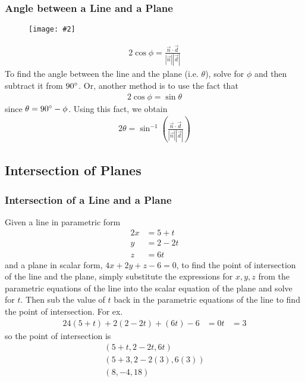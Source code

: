 \documentclass[letterpaper, 12pt]{report}
\newcommand{\diagram}[2][0.5]{
	\begin{figure}[H]
		\centering
		\texttt{[image: \#2]}
	\end{figure}
	}
\theoremstyle{definition}
\numberwithin{equation}{section}
\begin{document}
\subsubsection{Angle between a Line and a Plane}
\diagram{angle-between-line-and-plane}
\begin{alignat}{2}{}
	\cos \phi = \frac{\vec n \cdot \vec d}{|\vec n||\vec d|}
\end{alignat}
To find the angle between the line and the plane (i.e. $\theta$), solve for $\phi$ and then subtract it from $90 \degree$. Or, another method is to use the fact that
\begin{alignat}{2}{}
	\cos \phi = \sin \theta
\end{alignat}
since $\theta = 90 \degree - \phi$. Using this fact, we obtain
\begin{alignat}{2}{}
	\theta = \sin^{-1}\left(\frac{\vec n \cdot \vec d}{|\vec n||\vec d|} \right)
\end{alignat}



\subsection{Intersection of Planes}

\subsubsection{Intersection of a Line and a Plane}
Given a line in parametric form
\begin{alignat*}{2}{}
	x &= 5 + t \\
	y &= 2 - 2t \\
	z &= 6t
\end{alignat*}
and a plane in scalar form, $4x+2y+z-6=0$, to find the point of intersection of the line and the plane, simply substitute the expressions for $x,y,z$ from the parametric equations of the line into the scalar equation of the plane and solve for $t$. Then sub the value of $t$ back in the parametric equations of the line to find the point of intersection. For ex.
\begin{alignat*}{2}{}
	4(5+t)+2(2-2t)+(6t)-6&=0
	t&=3
\end{alignat*}
so the point of intersection is
\begin{gather*}
	(5+t,2-2t,6t) \\
	(5+3,2-2(3),6(3)) \\
	(8,-4,18)
\end{gather*}
\end{document}

